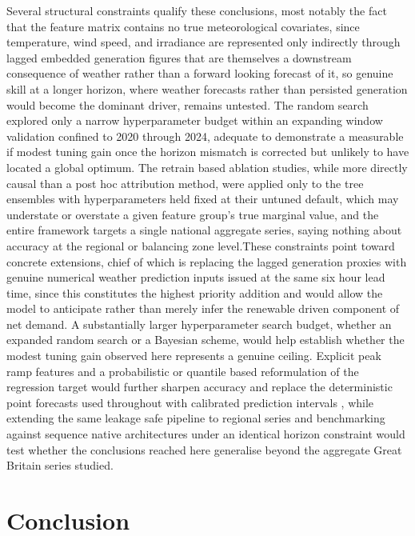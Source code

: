 \documentclass[runningheads]{llncs}
\begin{document}
Several structural constraints qualify these conclusions, most notably the fact that the feature matrix contains no true meteorological covariates, since temperature, wind speed, and irradiance are represented only indirectly through lagged embedded generation figures that are themselves a downstream consequence of weather rather than a forward looking forecast of it, so genuine skill at a longer horizon, where weather forecasts rather than persisted generation would become the dominant driver, remains untested. The random search explored only a narrow hyperparameter budget within an expanding window validation confined to 2020 through 2024, adequate to demonstrate a measurable if modest tuning gain once the horizon mismatch is corrected but unlikely to have located a global optimum. The retrain based ablation studies, while more directly causal than a post hoc attribution method, were applied only to the tree ensembles with hyperparameters held fixed at their untuned default, which may understate or overstate a given feature group's true marginal value, and the entire framework targets a single national aggregate series, saying nothing about accuracy at the regional or balancing zone level.These constraints point toward concrete extensions, chief of which is replacing the lagged generation proxies with genuine numerical weather prediction inputs issued at the same six hour lead time, since this constitutes the highest priority addition and would allow the model to anticipate rather than merely infer the renewable driven component of net demand. A substantially larger hyperparameter search budget, whether an expanded random search or a Bayesian scheme, would help establish whether the modest tuning gain observed here represents a genuine ceiling. Explicit peak ramp features and a probabilistic or quantile based reformulation of the regression target would further sharpen accuracy and replace the deterministic point forecasts used throughout with calibrated prediction intervals \cite{hong2016probabilistic,hong2016gefcom}, while extending the same leakage safe pipeline to regional series and benchmarking against sequence native architectures under an identical horizon constraint \cite{kong2019short} would test whether the conclusions reached here generalise beyond the aggregate Great Britain series studied.

\section{Conclusion}
\label{sec:conclusion}
\end{document}
